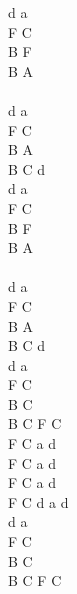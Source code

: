 \documentclass[a5paper, 10pt]{book}
\begin{document}
\begin{minipage}[t]{0.4\textwidth}
  d a\\
  F C\\
  B F\\
  B A\\
  \\
  d a\\
  F C\\
  B A\\
  B C d \\

  d a\\
  F C\\
  B F\\
  B A\\
  \\
  d a\\
  F C\\
  B A\\
  B C d \\

  d a  \\
  F C  \\
  B C  \\
  B C F C\\

  F C a d \\
  F C a d \\
  F C a d \\
  F C d a d\\

  d a  \\
  F C  \\
  B C  \\
  B C F C\\
\end{minipage}

\newpage
\end{document}
